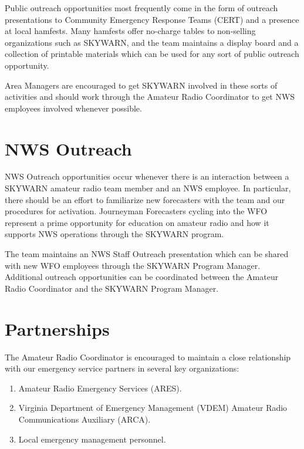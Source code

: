 \documentclass[pdflatex,letterpaper,twoside,12pt]{book}
\begin{document}
Public outreach opportunities most frequently come in the form of outreach presentations to Community Emergency Response Teams (CERT) and a presence at local hamfests.  Many hamfests offer no-charge tables to non-selling organizations such as SKYWARN, and the team maintains a display board and a collection of printable materials which can be used for any sort of public outreach opportunity.

Area Managers are encouraged to get SKYWARN involved in these sorts of activities and should work through the Amateur Radio Coordinator to get NWS employees involved whenever possible.


\section{NWS Outreach}

NWS Outreach opportunities occur whenever there is an interaction between a SKYWARN amateur radio team member and an NWS employee.  In particular, there should be an effort to familiarize new forecasters with the team and our procedures for activation.  Journeyman Forecasters cycling into the WFO represent a prime opportunity for education on amateur radio and how it supports NWS operations through the SKYWARN program.

The team maintains an NWS Staff Outreach presentation which can be shared with new WFO employees through the SKYWARN Program Manager.  Additional outreach opportunities can be coordinated between the Amateur Radio Coordinator and the SKYWARN Program Manager.


\section{Partnerships}

The Amateur Radio Coordinator is encouraged to maintain a close relationship with our emergency service partners in several key organizations:

\begin{enumerate}
\item Amateur Radio Emergency Services (ARES).
\item Virginia Department of Emergency Management (VDEM) Amateur Radio Communications Auxiliary (ARCA).
\item Local emergency management personnel.
\end{enumerate}
\end{document}
